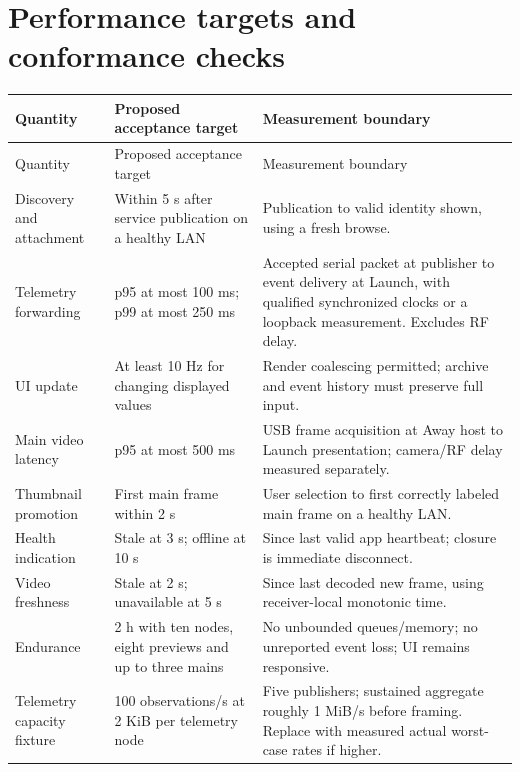 \section{Performance targets and conformance checks}

\begin{longtable}{L{42mm}L{41mm}L{78mm}}
\toprule Quantity & Proposed acceptance target & Measurement boundary\\\midrule
\endfirsthead
\toprule Quantity & Proposed acceptance target & Measurement boundary\\\midrule
\endhead
Discovery and attachment & Within 5 s after service publication on a healthy LAN & Publication to valid identity shown, using a fresh browse.\\
Telemetry forwarding & p95 at most 100 ms; p99 at most 250 ms & Accepted serial packet at publisher to event delivery at Launch, with qualified synchronized clocks or a loopback measurement. Excludes RF delay.\\
UI update & At least 10 Hz for changing displayed values & Render coalescing permitted; archive and event history must preserve full input.\\
Main video latency & p95 at most 500 ms & USB frame acquisition at Away host to Launch presentation; camera/RF delay measured separately.\\
Thumbnail promotion & First main frame within 2 s & User selection to first correctly labeled main frame on a healthy LAN.\\
Health indication & Stale at 3 s; offline at 10 s & Since last valid app heartbeat; closure is immediate disconnect.\\
Video freshness & Stale at 2 s; unavailable at 5 s & Since last decoded new frame, using receiver-local monotonic time.\\
Endurance & 2 h with ten nodes, eight previews and up to three mains & No unbounded queues/memory; no unreported event loss; UI remains responsive.\\
Telemetry capacity fixture & 100 observations/s at 2 KiB per telemetry node & Five publishers; sustained aggregate roughly 1 MiB/s before framing. Replace with measured actual worst-case rates if higher.\\
\bottomrule
\end{longtable}


